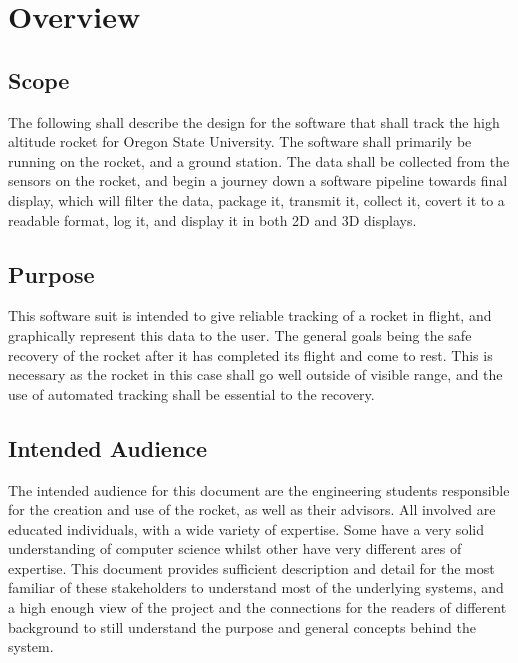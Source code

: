 \documentclass[onecolumn, draftclsnofoot,10pt, compsoc]{IEEEtran}
\begin{document}
\section {Overview}
\subsection {Scope}
The following shall describe the design for the software that shall track the high altitude rocket for Oregon State University. The software shall primarily be running on the rocket, and a ground station. The data shall be collected from the sensors on the rocket, and begin a journey down a software pipeline towards final display, which will filter the data, package it, transmit it, collect it, covert it to a readable format, log it, and display it in both 2D and 3D displays. 
\subsection {Purpose} 
This software suit is intended to give reliable tracking of a rocket in flight, and graphically represent this data to the user. The general goals being the safe recovery of the rocket after it has completed its flight and come to rest. This is necessary as the rocket in this case shall go well outside of visible range, and the use of automated tracking shall be essential to the recovery. 
\subsection {Intended Audience}
The intended audience for this document are the engineering students responsible for the creation and use of the rocket, as well as their advisors. All involved are educated individuals, with a wide variety of expertise. Some have a very solid understanding of computer science whilst other have very different ares of expertise. This document provides sufficient description and detail for the most familiar of these stakeholders to understand most of the underlying systems, and a high enough view of the project and the connections for the readers of different background to still understand the purpose and general concepts behind the system. 
\end{document}
